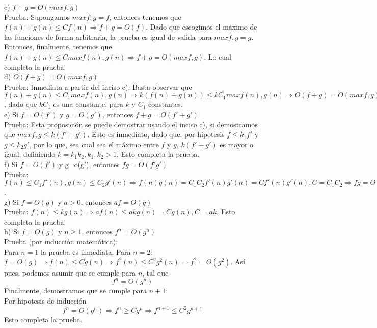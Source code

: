 \documentclass[12pt]{article}
\begin{document}
c) $f+g=O(max{f,g})$\\
Prueba: Supongamos $max{f,g}=f$, entonces tenemos que $f(n)+g(n)\leq Cf(n)\Longrightarrow f+g=O(f)$. Dado que escogimos el m\'aximo de las funciones de forma arbitraria, la prueba es igual de valida para $max{f,g}=g$. Entonces, finalmente, tenemos que $f(n)+g(n)\leq Cmax{f(n), g(n)}\Longrightarrow f+g=O(max{f,g})$. Lo cual completa la prueba.\\

d) $O(f+g)=O(max{f,g})$\\
Prueba: Inmediata a partir del inciso c). Basta observar que $f(n)+g(n)\leq C_1max{f(n), g(n)}\Longrightarrow k(f(n)+g(n))\leq kC_1max{f(n), g(n)}\Longrightarrow O(f+g)=O(max{f,g})$, dado que $kC_1$ es una constante, para $k$ y $C_1$ constantes.\\

e) Si $f=O(f')$ y $g=O(g')$, entonces $f+g=O(f'+g')$\\
Prueba: Esta proposici\'on se puede demostrar usando el inciso c), si demostramos que $max{f,g}\leq k(f'+g')$. Esto es inmediato, dado que, por hipotesis $f\leq k_1f'$ y $g\leq k_2g'$, por lo que, sea cual sea el m\'aximo entre $f$ y $g$, $k(f'+g')$ es mayor o igual, definiendo $k=k_1k_2, k_1,k_2>1$. Esto completa la prueba.\\

f) Si $f=O(f')$ y g=o(g'), entonces $fg=O(f'g')$\\
Prueba: $f(n)\leq C_1f'(n), g(n)\leq C_2g'(n)\Longrightarrow f(n)g(n)=C_1C_2f'(n)g'(n)=Cf'(n)g'(n), C=C_1C_2\Longrightarrow fg=O(f'g')$. \\

g) Si $f=O(g)$ y $a>0$, entonces $af=O(g)$\\
Prueba: $f(n)\leq kg(n)\Longrightarrow af(n)\leq akg(n)=Cg(n), C=ak$. Esto completa la prueba.\\

h) Si $f=O(g)$ y $n\geq 1$, entonces $f^{n}=O(g^{n})$\\
Prueba (por inducción matemática):\\
Para $n=1$ la prueba es inmediata. Para $n=2$: $f=O(g)\Longrightarrow f(n)\leq Cg(n)\Longrightarrow f^{2}(n)\leq C^2g^2(n)\Longrightarrow f^2=O(g^2)$.
Así pues, podemos asumir que se cumple para $n$, tal que $$f^n=O(g^n)$$
Finalmente, demostramos que se cumple para $n+1$: \\
Por hipotesis de inducci\'on
$$f^n=O(g^n)\Longrightarrow f^n\geq Cg^n \Longrightarrow f^{n+1}\leq C^2 g^{n+1}$$
Esto completa la prueba.
\end{document}

